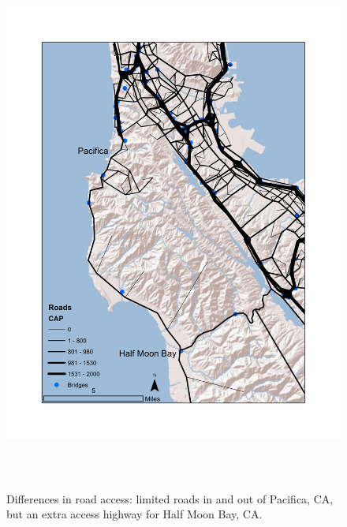 \begin{figure}[t]
    \centering
    \includegraphics[height=7in]{FIGS/equity_hmb.pdf} 
\caption{Differences in road access: limited roads in and out of Pacifica, CA, but an extra access highway for Half Moon Bay, CA.}
\label{fig:pac}
\end{figure}

